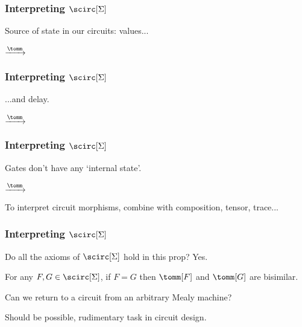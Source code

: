 \begin{frame}
    \frametitle{Interpreting $\scirc[\Sigma]$}    

    Source of \alert{state} in our circuits: \alert{values}...

    \pause

    \begin{center}
        \qquad
        \pause
        $\xrightarrow{\tomm}$
        \qquad
        \raisebox{-1.25em}{}
    \end{center}
\end{frame}

\begin{frame}
    \frametitle{Interpreting $\scirc[\Sigma]$}    
    ...and \alert{delay}.

    \pause
    \begin{center}
        \qquad
        \pause
        $\xrightarrow{\tomm}$
        \qquad
        \raisebox{-8em}{}
    \end{center}
\end{frame}


\begin{frame}
    \frametitle{Interpreting $\scirc[\Sigma]$}

    Gates don't have any `internal state'.

    \pause

    \begin{center}
        \qquad
        \pause
        $\xrightarrow{\tomm}$
        \qquad
        \raisebox{-1em}{}
    \end{center}

    \pause

    To interpret circuit morphisms, combine with composition, tensor, trace...

\end{frame}


\begin{frame}
    \frametitle{Interpreting $\scirc[\Sigma]$}

    Do all the axioms of $\scirc[\Sigma]$ hold in this prop? \pause \alert{Yes.}

    \pause

    \begin{theorem}
        For any $F,G \in \scirc[\Sigma]$, if $F = G$ then $\tomm[F]$ and $\tomm[G]$ are bisimilar.
    \end{theorem}

    \pause

    Can we return to a circuit from an arbitrary Mealy machine? 

    \pause

    Should be possible, rudimentary task in circuit design.

\end{frame}